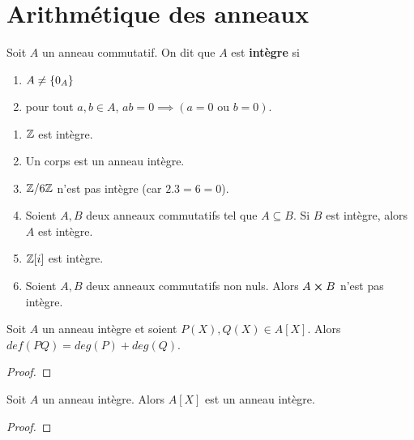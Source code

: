\section{Arithmétique des anneaux}

\begin{definition} 
	Soit $A$ un anneau commutatif. On dit que $A$ est \textbf{intègre} si
	\begin{enumerate}
		\item $A \neq \left\{ 0_{A} \right\}$
		\item pour tout $a, b \in A$, $ab = 0 \implies (a = 0 \text{ ou } b =
			0)$.
	\end{enumerate}
\end{definition}

\begin{exemple}
	\begin{enumerate}
		\item $\mathbb{Z}$ est intègre.
		\item Un corps est un anneau intègre.
		\item $\mathbb{Z} / 6 \mathbb{Z}$ n'est pas intègre (car $2 . 3 = 6 = 0$).
		\item Soient $A, B$ deux anneaux commutatifs tel que $A \subseteq B$. Si
			$B$ est intègre, alors $A$ est intègre.
		\item $\mathbb{Z}[i]$ est intègre.
		\item Soient $A, B$ deux anneaux commutatifs non nuls. Alors $A
			\cross B$ n'est pas intègre.
	\end{enumerate}
\end{exemple}

\begin{proposition}
	Soit $A$ un anneau intègre et soient $P(X), Q(X) \in A[X]$. Alors $def(P Q)
	= deg(P) + deg(Q)$.
\end{proposition}

\ifdefined\outputproof
\begin{proof}

\end{proof}
\fi

\begin{proposition}
	Soit $A$ un anneau intègre. Alors $A[X]$ est un anneau intègre.
\end{proposition}

\ifdefined\outputproof
\begin{proof}

\end{proof}
\fi

